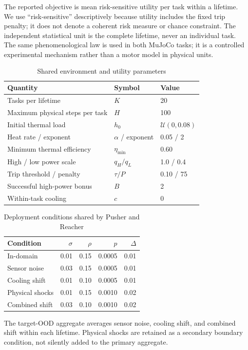 The reported objective is mean risk-sensitive utility per task within a
lifetime. We use ``risk-sensitive'' descriptively because utility includes the
fixed trip penalty; it does not denote a coherent risk measure or chance
constraint. The independent statistical unit is the complete lifetime, never
an individual task. The same phenomenological law is used in both MuJoCo tasks;
it is a controlled experimental mechanism rather than a motor model in physical
units.

\begin{table}[t]
\caption{Shared environment and utility parameters}
\label{tab:shared-parameters}
\centering
\begin{tabular}{lll}
\toprule
Quantity & Symbol & Value \\
\midrule
Tasks per lifetime & $K$ & 20 \\
Maximum physical steps per task & $H$ & 100 \\
Initial thermal load & $h_0$ & $\mathcal{U}(0,0.08)$ \\
Heat rate / exponent & $\alpha$ / exponent & 0.05 / 2 \\
Minimum thermal efficiency & $\eta_{\min}$ & 0.60 \\
High / low power scale & $q_H/q_L$ & 1.0 / 0.4 \\
Trip threshold / penalty & $\tau/P$ & 0.10 / 75 \\
Successful high-power bonus & $B$ & 2 \\
Within-task cooling & $c$ & 0 \\
\bottomrule
\end{tabular}
\end{table}

\begin{table}[t]
\caption{Deployment conditions shared by Pusher and Reacher}
\label{tab:conditions}
\centering
\begin{tabular}{lrrrr}
\toprule
Condition & $\sigma$ & $\rho$ & $p$ & $\Delta$ \\
\midrule
In-domain & 0.01 & 0.15 & 0.0005 & 0.01 \\
Sensor noise & 0.03 & 0.15 & 0.0005 & 0.01 \\
Cooling shift & 0.01 & 0.10 & 0.0005 & 0.01 \\
Physical shocks & 0.01 & 0.15 & 0.0010 & 0.02 \\
Combined shift & 0.03 & 0.10 & 0.0010 & 0.02 \\
\bottomrule
\end{tabular}
\end{table}

The target-OOD aggregate averages sensor noise, cooling shift, and combined
shift within each lifetime. Physical shocks are retained as a secondary
boundary condition, not silently added to the primary aggregate.
